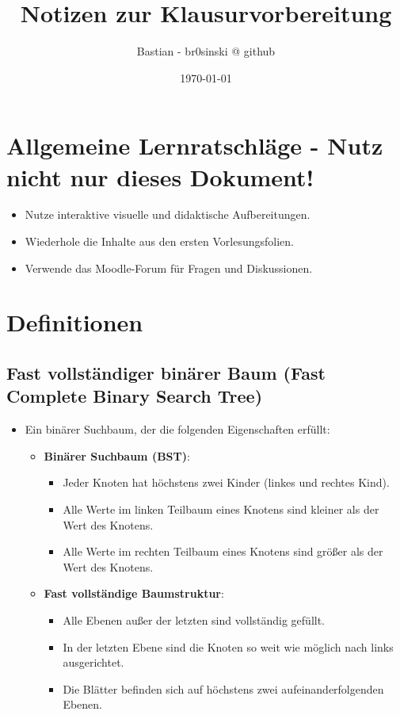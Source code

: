 \documentclass[a4paper,12pt]{article}
\title{Notizen zur Klausurvorbereitung}
\author{Bastian - br0sinski @ github}
\date{\today}
\begin{document}
\maketitle

\tableofcontents

\pagebreak

\section{Allgemeine Lernratschläge - Nutz nicht nur dieses Dokument!}
\begin{itemize}
    \item Nutze interaktive visuelle und didaktische Aufbereitungen.
    \item Wiederhole die Inhalte aus den ersten Vorlesungsfolien.
    \item Verwende das Moodle-Forum für Fragen und Diskussionen.
\end{itemize}

\pagebreak

\section{Definitionen}
\subsection{Fast vollständiger binärer Baum (Fast Complete Binary Search Tree)}
\begin{itemize}
    \item Ein binärer Suchbaum, der die folgenden Eigenschaften erfüllt:
    \begin{itemize}
        \item \textbf{Binärer Suchbaum (BST)}:
        \begin{itemize}
            \item Jeder Knoten hat höchstens zwei Kinder (linkes und rechtes Kind).
            \item Alle Werte im linken Teilbaum eines Knotens sind kleiner als der Wert des Knotens.
            \item Alle Werte im rechten Teilbaum eines Knotens sind größer als der Wert des Knotens.
        \end{itemize}
        \item \textbf{Fast vollständige Baumstruktur}:
        \begin{itemize}
            \item Alle Ebenen außer der letzten sind vollständig gefüllt.
            \item In der letzten Ebene sind die Knoten so weit wie möglich nach links ausgerichtet.
            \item Die Blätter befinden sich auf höchstens zwei aufeinanderfolgenden Ebenen.
        \end{itemize}
    \end{itemize}
\end{itemize}
\end{document}
